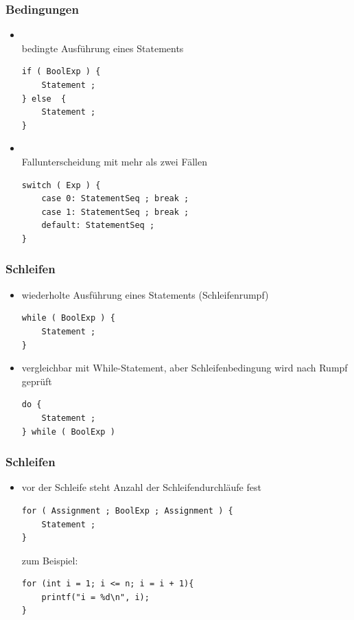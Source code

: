 \documentclass{beamer}
\begin{document}

\begin{frame}[fragile] \frametitle{Bedingungen}
	\small
	\begin{itemize}
		\item {} \\
		bedingte Ausführung eines Statements
\begin{lstlisting}[style=example]
if ( BoolExp ) {
	Statement ;
} else  {
	Statement ;
}
\end{lstlisting}
		\item {} \\
		Fallunterscheidung mit mehr als zwei Fällen
\begin{lstlisting}[style=example]
switch ( Exp ) {
	case 0: StatementSeq ; break ;
	case 1: StatementSeq ; break ;
	default: StatementSeq ;
}
\end{lstlisting}
	\end{itemize}
\end{frame}


\begin{frame}[fragile] \frametitle{Schleifen}
	\begin{itemize}
		\item {} wiederholte Ausführung eines Statements (Schleifenrumpf)
\begin{lstlisting}[style=example]
while ( BoolExp ) {
	Statement ;
}
\end{lstlisting}
		\item {} vergleichbar mit While-Statement, aber Schleifenbedingung wird nach Rumpf geprüft
\begin{lstlisting}[style=example]
do {
	Statement ;
} while ( BoolExp )
\end{lstlisting}

	\end{itemize}
\end{frame}


\begin{frame}[fragile] \frametitle{Schleifen}
	\begin{itemize}
		\item {} vor der Schleife steht Anzahl der Schleifendurchläufe fest
\begin{lstlisting}[style=example]
for ( Assignment ; BoolExp ; Assignment ) {
	Statement ;
}
\end{lstlisting}	
	zum Beispiel:
\begin{lstlisting}[style=example]
for (int i = 1; i <= n; i = i + 1){
	printf("i = %d\n", i);
}
\end{lstlisting}	
	\end{itemize}
\end{frame}
\end{document}
